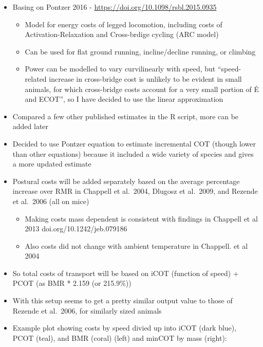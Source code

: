 \documentclass[
]{article}
\providecommand{\tightlist}{%
  \setlength{\itemsep}{0pt}\setlength{\parskip}{0pt}}
\begin{document}
\begin{itemize}
\tightlist
\item
  Basing on Pontzer 2016 - \url{https://doi.org/10.1098/rsbl.2015.0935}

  \begin{itemize}
  \tightlist
  \item
    Model for energy costs of legged locomotion, including costs of
    Activation-Relaxation and Cross-brdige cycling (ARC model)\\
  \item
    Can be used for flat ground running, incline/decline running, or
    climbing\\
  \item
    Power can be modelled to vary curvilinearly with speed, but
    ``speed-related increase in cross-bridge cost is unlikely to be
    evident in small animals, for which cross-bridge costs account for a
    very small portion of Ė and ECOT'', so I have decided to use the
    linear approximation\\
  \end{itemize}
\item
  Compared a few other published estimates in the R script, more can be
  added later\\
\item
  Decided to use Pontzer equation to estimate incremental COT (though
  lower than other equations) because it included a wide variety of
  species and gives a more updated estimate\\
\item
  Postural costs will be added separately based on the average
  percentage increase over RMR in Chappell et al.~2004, Dlugosz et
  al.~2009, and Rezende et al.~2006 (all on mice)

  \begin{itemize}
  \tightlist
  \item
    Making costs mass dependent is consistent with findings in Chappell
    et al 2013 doi.org/10.1242/jeb.079186\\
  \item
    Also costs did not change with ambient temperature in Chappell. et
    al 2004\\
  \end{itemize}
\item
  So total costs of transport will be based on iCOT (function of speed)
  + PCOT (as BMR * 2.159 (or 215.9\%))\\
\item
  With this setup seems to get a pretty similar output value to those of
  Rezende et al.~2006, for similarly sized animals\\
\item
  Example plot showing costs by speed divied up into iCOT (dark blue),
  PCOT (teal), and BMR (coral) (left) and minCOT by mass (right):
\end{itemize}
\end{document}
